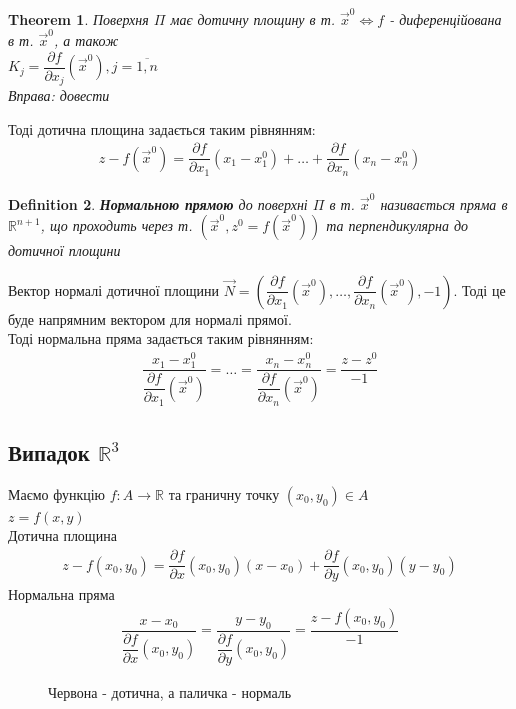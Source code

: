 \documentclass[a4paper, 14pt]{extarticle}
\theoremstyle{theoremdd}
\newtheorem{theorem}{Theorem}[subsection]
\theoremstyle{theoremdd}
\newtheorem{definition}[theorem]{Definition}
\theoremstyle{theoremdd}
\theoremstyle{theoremdd}
\theoremstyle{theoremdd}
\theoremstyle{theoremdd}
\theoremstyle{theoremdd}
\theoremstyle{theoremdd}
\def\departial#1#2{\dfrac{\partial {#1}}{\partial {#2}}}
\begin{document}
\begin{theorem}
Поверхня $\Pi$ має дотичну площину в т. $\vec{x}^0 \iff f$ - диференційована в т. $\vec{x}^0$, а також\\
$K_j = \departial{f}{x_j}(\vec{x}^0), j=\overline{1,n}$\\
\textit{Вправа: довести}
\end{theorem}

Тоді дотична площина задається таким рівнянням:
\begin{align*}
z - f(\vec{x}^0) = \departial{f}{x_1}(x_1-x_1^0) + \dots + \departial{f}{x_n}(x_n-x_n^0)
\end{align*}

\begin{definition}
\textbf{Нормальною прямою} до поверхні $\Pi$ в т. $\vec{x}^0$ називається пряма в $\mathbb{R}^{n+1}$, що проходить через т. $(\vec{x}^0, z^0 = f(\vec{x}^0))$ та перпендикулярна до дотичної площини
\end{definition}
Вектор нормалі дотичної площини $\vec{N} = \left( \departial{f}{x_1}(\vec{x}^0), \dots, \departial{f}{x_n}(\vec{x}^0), -1  \right)$. Тоді це буде напрямним вектором для нормалі прямої. \\
Тоді нормальна пряма задається таким рівнянням:
\begin{align*}
\dfrac{x_1 - x_1^0}{\departial{f}{x_1}(\vec{x}^0)} = \dots = \dfrac{x_n - x_n^0}{\departial{f}{x_n}(\vec{x}^0)} = \dfrac{z-z^0}{-1}
\end{align*}

\subsection*{Випадок $\mathbb{R}^3$}
Маємо функцію $f: A \to \mathbb{R}$ та граничну точку $(x_0,y_0) \in A$\\
$z = f(x,y)$\\
Дотична площина
\begin{align*}
z - f(x_0,y_0) = \departial{f}{x}(x_0,y_0)(x-x_0)+\departial{f}{y}(x_0,y_0)(y-y_0)
\end{align*}
Нормальна пряма
\begin{align*}
\dfrac{x-x_0}{\departial{f}{x}(x_0,y_0)} = \dfrac{y-y_0}{\departial{f}{y}(x_0,y_0)} = \dfrac{z-f(x_0,y_0)}{-1}
\end{align*}

\begin{figure}[H]
\centering
{}
\caption*{Червона - дотична, а паличка - нормаль}
\end{figure}
\end{document}
